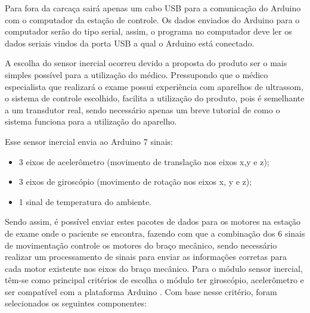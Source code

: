 Para fora da carcaça sairá apenas um cabo USB para a comunicação do Arduino com o computador da estação de controle. Os dados enviados do Arduino para o computador serão do tipo serial, assim, o programa no computador deve ler os dados seriais vindos da porta USB a qual o Arduino está conectado.

A escolha do sensor inercial ocorreu devido a proposta do produto ser o mais simples possível para a utilização do médico. Pressupondo que o médico especialista que realizará o exame possui experiência com aparelhos de ultrassom, o sistema de controle escolhido, facilita a utilização do produto, pois é semelhante a um transdutor real, sendo necessário apenas um breve tutorial de como o sistema funciona para a utilização do aparelho.

Esse sensor inercial envia ao Arduino 7 sinais:
\begin{itemize}
\item 3 eixos de acelerômetro (movimento de translação nos eixos x,y e z);
\item 3 eixos de giroscópio (movimento de rotação nos eixos x, y e z);
\item 1 sinal de temperatura do ambiente.
\end{itemize}

Sendo assim, é possível enviar estes pacotes de dados para os motores na estação de exame onde o paciente se encontra, fazendo com que a combinação dos 6 sinais de movimentação controle os motores do braço mecânico, sendo necessário realizar um processamento de sinais para enviar as informações corretas para cada motor existente nos eixos do braço mecânico.
    Para o módulo sensor inercial, têm-se como principal critérios de escolha o módulo ter giroscópio, acelerômetro e ser compatível com a plataforma Arduino \cite{bergmuller2015desenvolvimento}. Com base nesse critério, foram selecionados os seguintes componentes:

